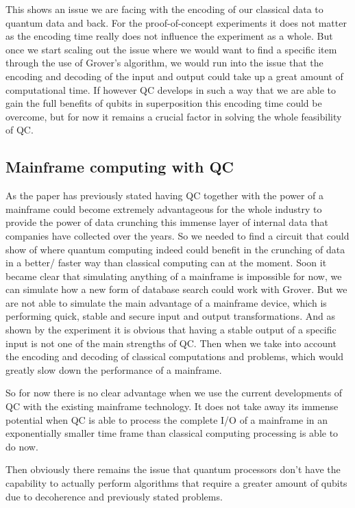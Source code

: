 This shows an issue we are facing with the encoding of our classical data to quantum data and back. For the proof-of-concept experiments it does not matter as the encoding time really does not influence the experiment as a whole. But once we start scaling out the issue where we would want to find a specific item through the use of Grover's algorithm, we would run into the issue that the encoding and decoding of the input and output could take up a great amount of computational time. If however QC develops in such a way that we are able to gain the full benefits of qubits in superposition this encoding time could be overcome, but for now it remains a crucial factor in solving the whole feasibility of QC.



\subsection{Mainframe computing with QC}

As the paper has previously stated having QC together with the power of a mainframe could become extremely advantageous for the whole industry to provide the power of data crunching this immense layer of internal data that companies have collected over the years. So we needed to find a circuit that could show of where quantum computing indeed could benefit in the crunching of data in a better/ faster way than classical computing can at the moment. Soon it became clear that simulating anything of a mainframe is impossible for now, we can simulate how a new form of database search could work with Grover. But we are not able to simulate the main advantage of a mainframe device, which is performing quick, stable and secure input and output transformations. And as shown by the experiment it is obvious that having a stable output of a specific input is not one of the main strengths of QC. Then when we take into account the encoding and decoding of classical computations and problems, which would greatly slow down the performance of a mainframe.

So for now there is no clear advantage when we use the current developments of QC with the existing mainframe technology. It does not take away its immense potential when QC is able to process the complete I/O of a mainframe in an exponentially smaller time frame than classical computing processing is able to do now.

Then obviously there remains the issue that quantum processors don't have the capability to actually perform algorithms that require a greater amount of qubits due to decoherence and previously stated problems.


